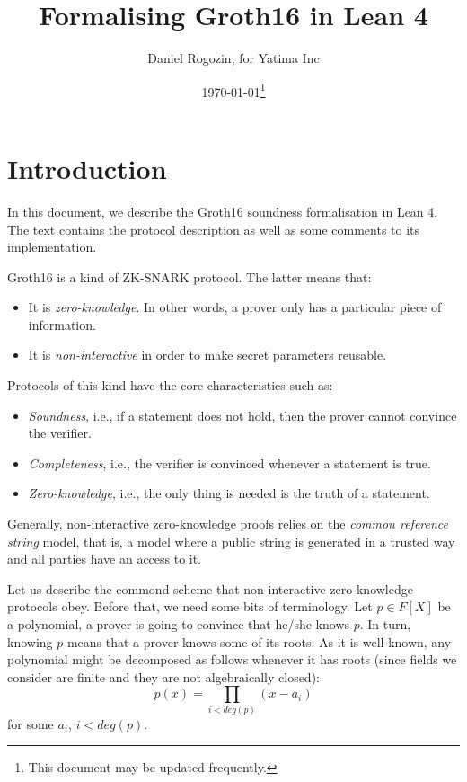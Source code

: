 \documentclass{article}
\title{Formalising Groth16 in Lean 4}
\author{Daniel Rogozin, for Yatima Inc}
\date{\today\footnote{This document may be updated frequently.}}
\theoremstyle{definition}
\theoremstyle{remark}
\begin{document}
\maketitle

\section{Introduction}

In this document, we describe the Groth16 soundness formalisation in Lean 4.
The text contains the protocol description as well as some comments to its implementation.

Groth16 is a kind of ZK-SNARK protocol. The latter means that:

\begin{itemize}
\item It is \emph{zero-knowledge}. In other words, a prover only has a particular piece of information.
\item It is \emph{non-interactive} in order to make secret parameters reusable.
\end{itemize}

Protocols of this kind have the core characteristics such as:
\begin{itemize}
\item \emph{Soundness}, i.e., if a statement does not hold, then the prover cannot convince the verifier.
\item \emph{Completeness}, i.e., the verifier is convinced whenever a statement is true.
\item \emph{Zero-knowledge}, i.e., the only thing is needed is the truth of a statement.
\end{itemize}

Generally, non-interactive zero-knowledge proofs relies on the \emph{common reference string} model, that is, a model where a public string is generated in a trusted way and all parties have an access to it.

Let us describe the commond scheme that non-interactive zero-knowledge protocols obey. Before that, we need some bits of terminology. Let $p \in F[X]$ be a polynomial, a prover is going to convince that he/she knows $p$. In turn, knowing $p$ means that a prover knows some of its roots. As it is well-known, any polynomial might be decomposed as follows whenever it has roots (since fields we consider are finite and they are not algebraically closed):
\begin{equation}
p(x) = \prod_{i < deg(p)} (x - a_i)
\end{equation}
for some $a_i$, $i < deg(p)$.
\end{document}
